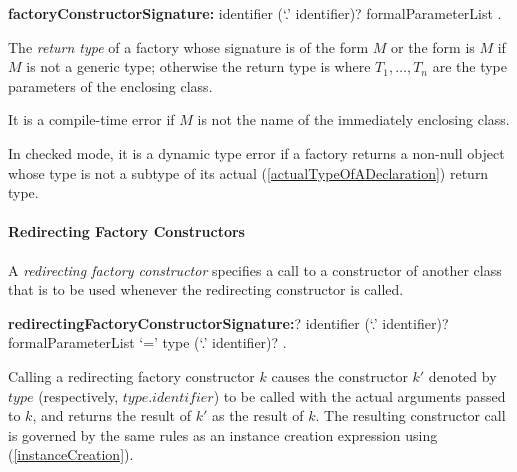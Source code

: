 \documentclass{article}
\begin{document}
\begin{grammar}
{\bf factoryConstructorSignature:}\FACTORY{} identifier (`{\escapegrammar .}' identifier)? formalParameterList
  .
\end{grammar}


\LMHash{}
The {\em return type} of a factory whose signature is of the form \FACTORY{} $M$ or the form \FACTORY{}  is $M$ if $M$ is not a generic type;
otherwise the return type is  where $T_1, \ldots, T_n$ are the type parameters of the enclosing class.

\LMHash{}
It is a compile-time error if $M$ is not the name of the immediately enclosing class.

\LMHash{}
In checked mode, it is a dynamic type error if a factory returns a non-null object whose type is not a subtype of its actual (\ref{actualTypeOfADeclaration}) return type.




\paragraph{Redirecting Factory Constructors}

\LMHash{}
A {\em redirecting factory constructor} specifies a call to a constructor of another class that is to be used whenever the redirecting constructor is called.

\begin{grammar}
{\bf redirectingFactoryConstructorSignature:}\CONST{}? \FACTORY{} identifier (`{\escapegrammar .}' identifier)? formalParameterList
  \gnewline{} `=' type (`{\escapegrammar .}' identifier)?
  .
\end{grammar}

\LMHash{}
Calling a redirecting factory constructor $k$ causes the constructor $k'$ denoted by $type$ (respectively, $type.identifier$) to be called with the actual arguments passed to $k$, and returns the result of $k'$ as the result of $k$.
The resulting constructor call is governed by the same rules as an instance creation expression using \NEW{} (\ref{instanceCreation}).
\end{document}
